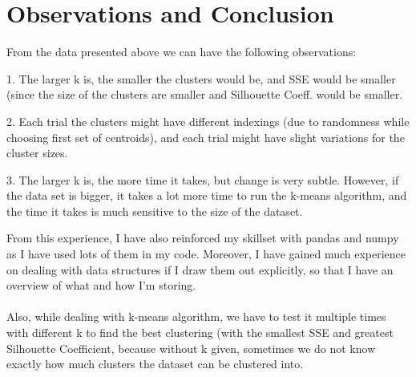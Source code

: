 \documentclass[12pt]{article}
\begin{document}
\section*{Observations and Conclusion}
\begin{flushleft}
From the data presented above we can have the following observations:
\end{flushleft}
\begin{flushleft}
1. The larger k is, the smaller the clusters would be, and SSE would be smaller (since the size of the clusters are smaller and Silhouette Coeff. would be smaller.
\end{flushleft}

\begin{flushleft}
2. Each trial the clusters might have different indexings (due to randomness while choosing first set of centroids), and each trial might have slight variations for the cluster sizes.
\end{flushleft}
\begin{flushleft}
3. The larger k is, the more time it takes, but change is very subtle. However, if the data set is bigger, it takes a lot more time to run the k-means algorithm, and the time it takes is much sensitive to the size of the dataset.
\end{flushleft}

\begin{flushleft}
From this experience, I have also reinforced my skillset with pandas and numpy as I have used lots of them in my code. Moreover, I have gained much experience on dealing with data structures if I draw them out explicitly, so that I have an overview of what and how I'm storing. \\\\
Also, while dealing with k-means algorithm, we have to test it multiple times with different k to find the best clustering (with the smallest SSE and greatest Silhouette Coefficient, because without k given, sometimes we do not know exactly how much clusters the dataset can be clustered into.
\end{flushleft}
\end{document}
